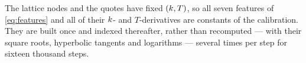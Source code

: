 %
%
%

The lattice nodes and the quotes have fixed $(k,T)$, so all seven features of
\eqref{eq:features} and all of their $k$- and $T$-derivatives are constants of the calibration.
They are built once and indexed thereafter, rather than recomputed --- with their square roots,
hyperbolic tangents and logarithms --- several times per step for sixteen thousand steps.

